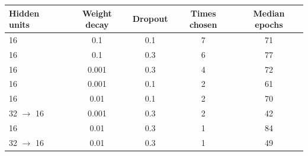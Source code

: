 \begin{tabular}{lcccc}
\toprule
Hidden units & Weight decay & Dropout & Times chosen & Median epochs \\
\midrule
16 & 0.1 & 0.1 & 7 & 71 \\
16 & 0.1 & 0.3 & 6 & 77 \\
16 & 0.001 & 0.3 & 4 & 72 \\
16 & 0.001 & 0.1 & 2 & 61 \\
16 & 0.01 & 0.1 & 2 & 70 \\
32 $\to$ 16 & 0.001 & 0.3 & 2 & 42 \\
16 & 0.01 & 0.3 & 1 & 84 \\
32 $\to$ 16 & 0.01 & 0.3 & 1 & 49 \\
\bottomrule
\end{tabular}
